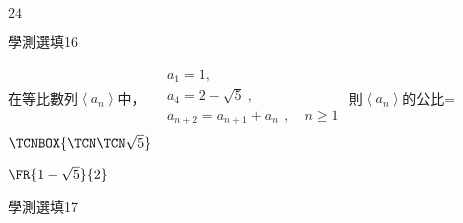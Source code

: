\begin{QUESTIONS}
\begin{QUESTION}
\begin{QBODY}
        \end{QBODY}
        \begin{QFROMS}
        \end{QFROMS}
        \begin{QTAGS}\end{QTAGS}
        \begin{QANS}
            $24$
        \end{QANS}
        \begin{QSOLLIST}
        \end{QSOLLIST}
        \begin{QEMPTYSPACE}
        \end{QEMPTYSPACE}
    \end{QUESTION}
    \begin{QUESTION}
        \begin{ExamInfo}{87}{學測}{選填}{16}
        \end{ExamInfo}
        \begin{ExamAnsRateInfo}{}{}{}{}
        \end{ExamAnsRateInfo}
        \begin{QBODY}
            在等比數列$\left\langle {{a}_{n}} \right\rangle $中，
            $\begin{aligned}
              & {{a}_{1}}=1, \\ 
             & {{a}_{4}}=2-\sqrt{5}\ , \\ 
             & {{a}_{n+2}}={{a}_{n+1}}+{{a}_{n}}\ \,,\quad n\ge 1 \\ 
            \end{aligned}$
            則$\left\langle {{a}_{n}} \right\rangle $的公比=    $\TCNBOX{\TCN\TCN\sqrt{5}}$
        \end{QBODY}
        \begin{QFROMS}
        \end{QFROMS}
        \begin{QTAGS}\end{QTAGS}
        \begin{QANS}
            $\FR{1-\sqrt{5}}{2}$
        \end{QANS}
        \begin{QSOLLIST}
        \end{QSOLLIST}
        \begin{QEMPTYSPACE}
        \end{QEMPTYSPACE}
    \end{QUESTION}
    \begin{QUESTION}
        \begin{ExamInfo}{87}{學測}{選填}{17}

\end{ExamInfo}
\end{QUESTION}
\end{QUESTIONS}
